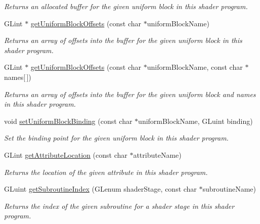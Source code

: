 \begin{DoxyCompactItemize}
\begin{DoxyCompactList}\small\item\em Returns an allocated buffer for the given uniform block in this shader program. \end{DoxyCompactList}\item 
G\+Lint $\ast$ \hyperlink{class_c_s_c_i441_1_1_shader_program_a86f97ca91c4a86a59749d7470b7e20d9}{get\+Uniform\+Block\+Offsets} (const char $\ast$uniform\+Block\+Name)
\begin{DoxyCompactList}\small\item\em Returns an array of offsets into the buffer for the given uniform block in this shader program. \end{DoxyCompactList}\item 
G\+Lint $\ast$ \hyperlink{class_c_s_c_i441_1_1_shader_program_aeebfe8124ca9d60896e1443e9eded2b6}{get\+Uniform\+Block\+Offsets} (const char $\ast$uniform\+Block\+Name, const char $\ast$names\mbox{[}$\,$\mbox{]})
\begin{DoxyCompactList}\small\item\em Returns an array of offsets into the buffer for the given uniform block and names in this shader program. \end{DoxyCompactList}\item 
void \hyperlink{class_c_s_c_i441_1_1_shader_program_ae1200c6f7a7afd36ed1090eb47a7d3ac}{set\+Uniform\+Block\+Binding} (const char $\ast$uniform\+Block\+Name, G\+Luint binding)
\begin{DoxyCompactList}\small\item\em Set the binding point for the given uniform block in this shader program. \end{DoxyCompactList}\item 
G\+Lint \hyperlink{class_c_s_c_i441_1_1_shader_program_a6b3373c96832a3dd4e6ba60d965748f5}{get\+Attribute\+Location} (const char $\ast$attribute\+Name)
\begin{DoxyCompactList}\small\item\em Returns the location of the given attribute in this shader program. \end{DoxyCompactList}\item 
G\+Luint \hyperlink{class_c_s_c_i441_1_1_shader_program_a6a8732a9fb89b0870c40ed5d8b8b7c09}{get\+Subroutine\+Index} (G\+Lenum shader\+Stage, const char $\ast$subroutine\+Name)
\begin{DoxyCompactList}\small\item\em Returns the index of the given subroutine for a shader stage in this shader program. \end{DoxyCompactList}\item 

\end{DoxyCompactItemize}
